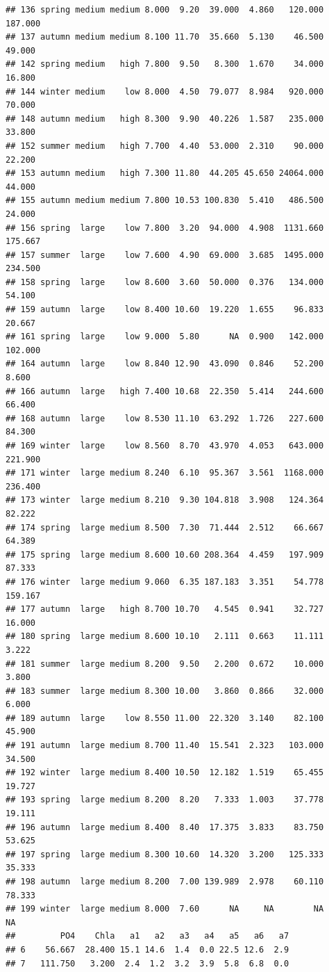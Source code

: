 \documentclass[]{report}
\begin{document}
\begin{verbatim}
## 136 spring medium medium 8.000  9.20  39.000  4.860   120.000 187.000
## 137 autumn medium medium 8.100 11.70  35.660  5.130    46.500  49.000
## 142 spring medium   high 7.800  9.50   8.300  1.670    34.000  16.800
## 144 winter medium    low 8.000  4.50  79.077  8.984   920.000  70.000
## 148 autumn medium   high 8.300  9.90  40.226  1.587   235.000  33.800
## 152 summer medium   high 7.700  4.40  53.000  2.310    90.000  22.200
## 153 autumn medium   high 7.300 11.80  44.205 45.650 24064.000  44.000
## 155 autumn medium medium 7.800 10.53 100.830  5.410   486.500  24.000
## 156 spring  large    low 7.800  3.20  94.000  4.908  1131.660 175.667
## 157 summer  large    low 7.600  4.90  69.000  3.685  1495.000 234.500
## 158 spring  large    low 8.600  3.60  50.000  0.376   134.000  54.100
## 159 autumn  large    low 8.400 10.60  19.220  1.655    96.833  20.667
## 161 spring  large    low 9.000  5.80      NA  0.900   142.000 102.000
## 164 autumn  large    low 8.840 12.90  43.090  0.846    52.200   8.600
## 166 autumn  large   high 7.400 10.68  22.350  5.414   244.600  66.400
## 168 autumn  large    low 8.530 11.10  63.292  1.726   227.600  84.300
## 169 winter  large    low 8.560  8.70  43.970  4.053   643.000 221.900
## 171 winter  large medium 8.240  6.10  95.367  3.561  1168.000 236.400
## 173 winter  large medium 8.210  9.30 104.818  3.908   124.364  82.222
## 174 spring  large medium 8.500  7.30  71.444  2.512    66.667  64.389
## 175 spring  large medium 8.600 10.60 208.364  4.459   197.909  87.333
## 176 winter  large medium 9.060  6.35 187.183  3.351    54.778 159.167
## 177 autumn  large   high 8.700 10.70   4.545  0.941    32.727  16.000
## 180 spring  large medium 8.600 10.10   2.111  0.663    11.111   3.222
## 181 summer  large medium 8.200  9.50   2.200  0.672    10.000   3.800
## 183 summer  large medium 8.300 10.00   3.860  0.866    32.000   6.000
## 189 autumn  large    low 8.550 11.00  22.320  3.140    82.100  45.900
## 191 autumn  large medium 8.700 11.40  15.541  2.323   103.000  34.500
## 192 winter  large medium 8.400 10.50  12.182  1.519    65.455  19.727
## 193 spring  large medium 8.200  8.20   7.333  1.003    37.778  19.111
## 196 autumn  large medium 8.400  8.40  17.375  3.833    83.750  53.625
## 197 spring  large medium 8.300 10.60  14.320  3.200   125.333  35.333
## 198 autumn  large medium 8.200  7.00 139.989  2.978    60.110  78.333
## 199 winter  large medium 8.000  7.60      NA     NA        NA      NA
##         PO4    Chla   a1   a2   a3   a4   a5   a6   a7
## 6    56.667  28.400 15.1 14.6  1.4  0.0 22.5 12.6  2.9
## 7   111.750   3.200  2.4  1.2  3.2  3.9  5.8  6.8  0.0

\end{verbatim}
\end{document}
